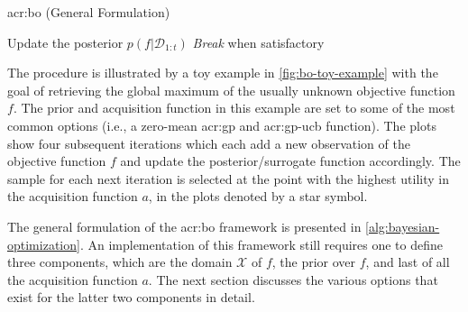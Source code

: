 
\begin{algorithm}[!t]
	\caption{\acrlong{acr:bo} (General Formulation) \label{alg:bayesian-optimization}}
	\begin{algorithmic}[1]
		 
			 
			\State Update the posterior $p(f \vert \mathcal{D}_{1:t})$
			\State \textit{Break} when satisfactory 
		\EndFor
		\State {}
	\end{algorithmic}
\end{algorithm}

The procedure is illustrated by a toy example in \autoref{fig:bo-toy-example}  with the goal of retrieving the global maximum of the usually unknown objective function $f$.
The prior and acquisition function in this example are set to some of the most common options (i.e., a zero-mean \acrlong{acr:gp} and \acrshort{acr:gp-ucb} function).
The plots show four subsequent iterations which each add a new observation of the objective function $f$ and update the posterior/surrogate function accordingly.
The sample for each next iteration is selected at the point with the highest utility in the acquisition function $a$, in the plots denoted by a star symbol.

The general formulation of the \acrshort{acr:bo} framework is presented in \autoref{alg:bayesian-optimization}.
An implementation of this framework still requires one to define three components, which are the domain $\mathcal{X}$ of $f$, the prior over $f$, and last of all the acquisition function $a$.
The next section discusses the various options that exist for the latter two components in detail.

\newpage

